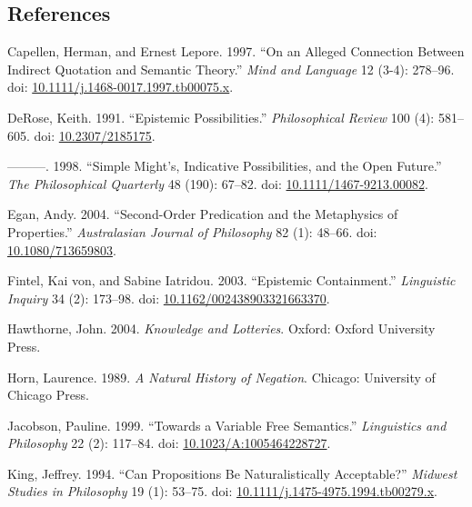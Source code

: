 \documentclass[
  10pt,
  letterpaper,
  DIV=11,
  numbers=noendperiod,
  twoside]{scrartcl}
\newlength{\cslhangindent}
\newenvironment{CSLReferences}[2] %
 {\begin{list}{}{%
  \setlength{\itemindent}{0pt}
  \setlength{\leftmargin}{0pt}
  \setlength{\parsep}{0pt}
  \ifodd #1
   \setlength{\leftmargin}{\cslhangindent}
   \setlength{\itemindent}{-1\cslhangindent}
  \fi
  \setlength{\itemsep}{#2\baselineskip}}}
 {\end{list}}
\begin{document}
\subsection*{References}\label{references}

\label{refs}
\begin{CSLReferences}{1}{0}
Capellen, Herman, and Ernest Lepore. 1997. {``On an Alleged Connection
Between Indirect Quotation and Semantic Theory.''} \emph{Mind and
Language} 12 (3-4): 278--96. doi:
\href{https://doi.org/10.1111/j.1468-0017.1997.tb00075.x}{10.1111/j.1468-0017.1997.tb00075.x}.

DeRose, Keith. 1991. {``Epistemic Possibilities.''} \emph{Philosophical
Review} 100 (4): 581--605. doi:
\href{https://doi.org/10.2307/2185175}{10.2307/2185175}.

---------. 1998. {``Simple Might's, Indicative Possibilities, and the
Open Future.''} \emph{The Philosophical Quarterly} 48 (190): 67--82.
doi:
\href{https://doi.org/10.1111/1467-9213.00082}{10.1111/1467-9213.00082}.

Egan, Andy. 2004. {``Second-Order Predication and the Metaphysics of
Properties.''} \emph{Australasian Journal of Philosophy} 82 (1): 48--66.
doi: \href{https://doi.org/10.1080/713659803}{10.1080/713659803}.

Fintel, Kai von, and Sabine Iatridou. 2003. {``Epistemic Containment.''}
\emph{Linguistic Inquiry} 34 (2): 173--98. doi:
\href{https://doi.org/10.1162/002438903321663370}{10.1162/002438903321663370}.

Hawthorne, John. 2004. \emph{Knowledge and Lotteries}. Oxford: Oxford
University Press.

Horn, Laurence. 1989. \emph{A Natural History of Negation}. Chicago:
University of Chicago Press.

Jacobson, Pauline. 1999. {``Towards a Variable Free Semantics.''}
\emph{Linguistics and Philosophy} 22 (2): 117--84. doi:
\href{https://doi.org/10.1023/A:1005464228727}{10.1023/A:1005464228727}.

King, Jeffrey. 1994. {``Can Propositions Be Naturalistically
Acceptable?''} \emph{Midwest Studies in Philosophy} 19 (1): 53--75. doi:
\href{https://doi.org/10.1111/j.1475-4975.1994.tb00279.x}{10.1111/j.1475-4975.1994.tb00279.x}.


\end{CSLReferences}
\end{document}
